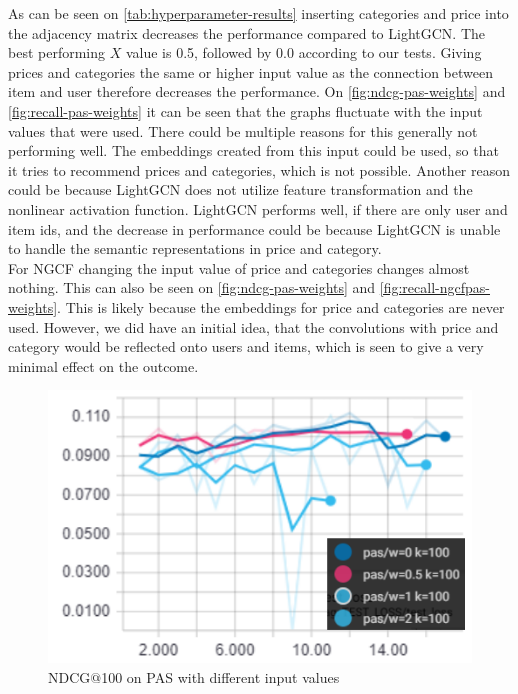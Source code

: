 As can be seen on \autoref{tab:hyperparameter-results} inserting categories and price into the adjacency matrix decreases the performance compared to LightGCN.
The best performing $X$ value is 0.5, followed by 0.0 according to our tests.
Giving prices and categories the same or higher input value as the connection between item and user therefore decreases the performance.
On \autoref{fig:ndcg-pas-weights} and \autoref{fig:recall-pas-weights} it can be seen that the graphs fluctuate with the input values that were used.
There could be multiple reasons for this generally not performing well.
The embeddings created from this input could be used, so that it tries to recommend prices and categories, which is not possible.
Another reason could be because LightGCN does not utilize feature transformation and the nonlinear activation function.
LightGCN performs well, if there are only user and item ids, and the decrease in performance could be because LightGCN is unable to handle the semantic representations in price and category.\\
For NGCF changing the input value of price and categories changes almost nothing.
This can also be seen on \autoref{fig:ndcg-pas-weights} and \autoref{fig:recall-ngcfpas-weights}.
This is likely because the embeddings for price and categories are never used.
However, we did have an initial idea, that the convolutions with price and category would be reflected onto users and items, which is seen to give a very minimal effect on the outcome.


\begin{figure}
    \includegraphics[width=\linewidth]{figures/graphs/ndcg-pas-weights.png}
    \caption{NDCG$@$100 on PAS with different input values}
    \label{fig:ndcg-pas-weights}
\end{figure}

